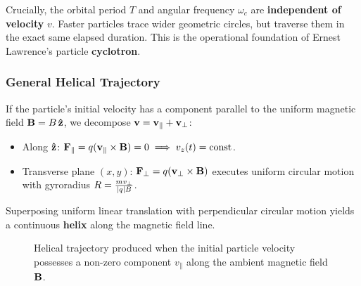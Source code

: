 \begin{remark}
Crucially, the orbital period $T$ and angular frequency $\omega_c$ are \textbf{independent of velocity} $v$. Faster particles trace wider geometric circles, but traverse them in the exact same elapsed duration. This is the operational foundation of Ernest Lawrence's particle \textbf{cyclotron}.
\end{remark}

\subsubsection{General Helical Trajectory}

If the particle's initial velocity has a component parallel to the uniform magnetic field $\vb{B} = B\,\vu{z}$, we decompose $\vb{v} = \vb{v}_{\parallel} + \vb{v}_{\perp}$:
\begin{itemize}
    \item Along $\vu{z}$: $\vb{F}_{\parallel} = q(\vb{v}_{\parallel} \times \vb{B}) = 0 \implies v_z(t) = \text{const}$.
    \item Transverse plane $(x,y)$: $\vb{F}_{\perp} = q(\vb{v}_{\perp} \times \vb{B})$ executes uniform circular motion with gyroradius $R = \frac{m v_{\perp}}{\abs{q} B}$.
\end{itemize}

Superposing uniform linear translation with perpendicular circular motion yields a continuous \textbf{helix} along the magnetic field line.

\begin{figure}[htbp]
    \centering
    \caption{Helical trajectory produced when the initial particle velocity possesses a non-zero component $v_{\parallel}$ along the ambient magnetic field $\vb{B}$.}
    \label{fig:helical_motion}
\end{figure}

